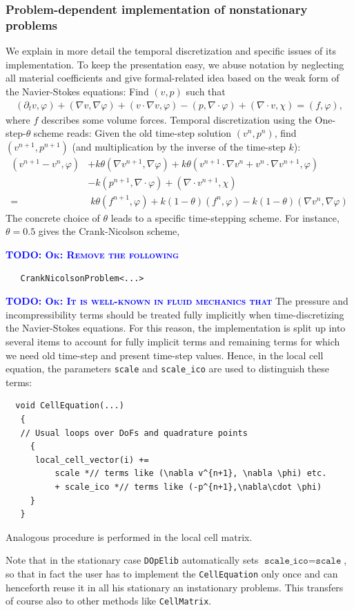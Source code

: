 \documentclass[prodmode,acmtoms]{acmsmall}
\numberwithin{equation}{section}
\renewcommand{\phi}{\varphi}
\newcommand{\dope}{\texttt{DOpElib}}
\newcommand{\todo}[1]{\textbf{\textsc{\textcolor{blue}{TODO: #1}}}}
\begin{document}
\subsubsection{Problem-dependent 
implementation of nonstationary problems}
\label{sec:timedep:implementation}
We explain in more detail the temporal discretization
and specific issues of its implementation. 
To keep the presentation easy, we abuse notation 
by neglecting
all material coefficients
and give formal-related idea based on the weak 
form of the Navier-Stokes equations:
Find $(v,p)$ such that
\begin{align*}
(\partial_t v,\phi) 
+ (\nabla v, \nabla \phi)
+ (v\cdot\nabla v,\phi)
-(p,\nabla\cdot \phi)
+(\nabla\cdot v, \chi)
=(f,\phi),
\end{align*}
where $f$ describes some volume forces.
Temporal discretization using the One-step-$\theta$ scheme reads:
Given the old time-step solution $(v^n,p^n)$, 
find $(v^{n+1}, p^{n+1})$ (and multiplication 
by the inverse of the time-step $k$):
\begin{align*}
(v^{n+1} - v^{n}, \phi)
&+ k\theta (\nabla v^{n+1}, \nabla \phi)
+ k\theta (v^{n+1}\cdot\nabla v^n + 
  v^{n}\cdot\nabla v^{n+1},\phi)\\
&- k (p^{n+1},\nabla\cdot \phi)
+ (\nabla\cdot v^{n+1}, \chi)\\
=&\; k\theta (f^{n+1},\phi) + k(1-\theta) (f^{n},\phi)
- k(1-\theta) (\nabla v^{n}, \nabla \phi) 
\end{align*}
The concrete choice of $\theta$ leads to a
specific time-stepping scheme. For instance,
$\theta = 0.5$ gives the Crank-Nicolson scheme,

\todo{Ok: Remove the following}
\begin{lstlisting}
   CrankNicolsonProblem<...>
\end{lstlisting}

\todo{Ok: It is well-known in fluid mechanics that}
The pressure and incompressibility terms should be 
treated fully implicitly when time-discretizing 
the Navier-Stokes equations.
For this reason, the implementation is split up
into several items to account for fully implicit 
terms and remaining terms for which we need 
old time-step and present time-step values. 
Hence, in the local cell equation, the parameters
\texttt{scale} and \texttt{scale\_ico}
are used to distinguish these terms:
\begin{lstlisting}
  void CellEquation(...)
   {
   // Usual loops over DoFs and quadrature points
     {
      local_cell_vector(i) +=  
          scale *// terms like (\nabla v^{n+1}, \nabla \phi) etc.
          + scale_ico *// terms like (-p^{n+1},\nabla\cdot \phi)
     }
   }
\end{lstlisting}
Analogous procedure is performed in the local 
cell matrix.
\begin{remark}
Note that in the stationary case \dope{} automatically sets $ \texttt{scale\_ico} = \texttt{scale}$, so that in fact the user has to implement the \texttt{CellEquation} only once and can henceforth reuse it in all his stationary an instationary problems. This transfers of course also to other methods like \texttt{CellMatrix}.
\end{remark}
\end{document}

